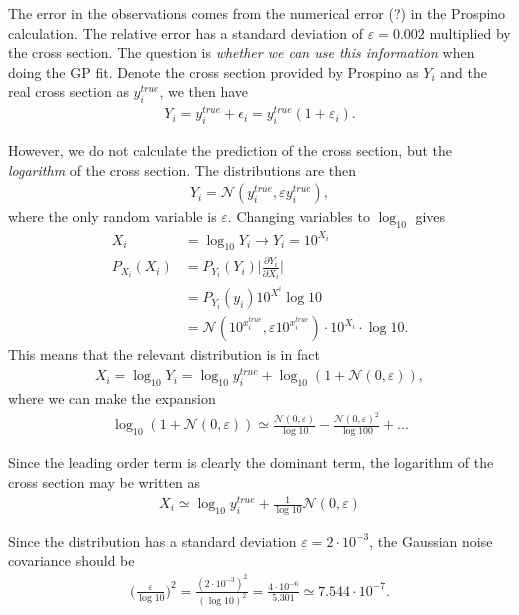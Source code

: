 \documentclass[twoside,english]{uiofysmaster}
\begin{document}
The error in the observations comes from the numerical error (?) in the Prospino calculation. The relative error has a standard deviation of $\varepsilon = 0.002$ multiplied by the cross section. The question is \textit{whether we can use this information} when doing the GP fit. Denote the cross section provided by Prospino as $Y_i$ and the real cross section as $y_i^{true}$, we then have
\begin{align}\label{Eq:: cross section w/ error}
Y_i = y^{true}_i + \epsilon_i = y_i^{true}(1 + \varepsilon_i).
\end{align}


However, we do not calculate the prediction of the cross section, but the \textit{logarithm} of the cross section. The distributions are then
\begin{align}
Y_i = \mathcal{N}(y_i^{true}, \varepsilon y_i^{true}),
\end{align}
where the only random variable is $\varepsilon$. Changing variables to $\log_{10}$ gives
\begin{align}
X_i &= \log_{10} Y_i \rightarrow Y_i = 10^{X_i}\\
P_{X_i} (X_i) &= P_{Y_i} (Y_i) \Big|\frac{\partial Y_i}{\partial X_i}\Big|\\
&= P_{Y_i} (y_i) 10^{X^i} \log 10\\
&= \mathcal{N} (10^{x_i^{true}}, \varepsilon 10^{x_i^{true}}) \cdot 10^{X_i} \cdot \log 10.
\end{align}
This means that the relevant distribution is in fact
\begin{align*}
X_i = \log_{10} Y_i = \log_{10} y_i^{true} + \log_{10} (1 + \mathcal{N}(0, \varepsilon)),
\end{align*}
where we can make the expansion
\begin{align}
\log_{10} (1 + \mathcal{N}(0, \varepsilon)) \simeq \frac{\mathcal{N} (0, \varepsilon)}{\log 10} - \frac{\mathcal{N} (0, \varepsilon)^2}{\log 100} +...
\end{align}

Since the leading order term is clearly the dominant term, the logarithm of the cross section may be written as
\begin{align}\label{Eq:: cross section log gaussian noise}
X_i \simeq \log_{10} y_i^{true} + \frac{1}{\log 10} \mathcal{N} (0, \varepsilon)
\end{align}

Since the distribution has a standard deviation $\varepsilon = 2 \cdot 10^{-3}$, the Gaussian noise covariance should be
\begin{align*}
\Big( \frac{\varepsilon}{\log 10} \Big)^2 = \frac{(2 \cdot 10^{-3})^2}{(\log 10)^2} = \frac{4 \cdot 10^{-6}}{5.301} \simeq 7.544 \cdot 10^{-7}.
\end{align*}
\end{document}
